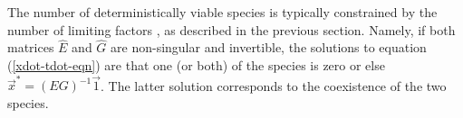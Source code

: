 %
%
The number of deterministically viable species is typically constrained by the number of limiting factors \cite{Armstrong1980}, as described in the previous section. 
Namely, if both matrices $\hat{E}$ and $ \hat{G}$ are non-singular and invertible, the solutions to equation (\ref{xdot-tdot-eqn}) are that one (or both) of the species is zero or else $\vec{x}^* = (E G)^{-1}\vec{1}$. 
The latter solution corresponds to the coexistence of the two species.

